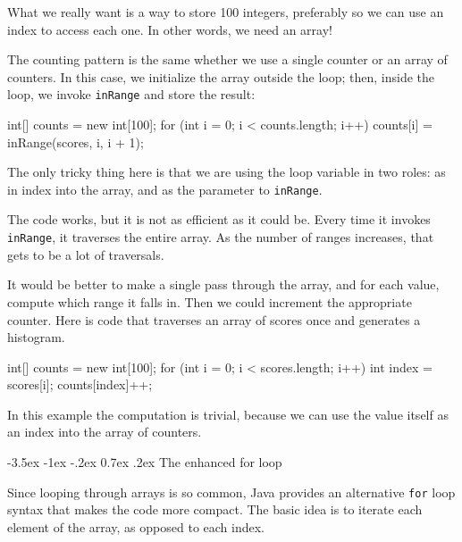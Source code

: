 \documentclass[12pt]{book}
\makeatletter
\theoremstyle{exercise}
\newcommand{\java}[1]{\verb"#1"}
\renewcommand{\section}{\@startsection {section}{1}{\z@}%
    {-3.5ex \@plus -1ex \@minus -.2ex}%
    {0.7ex \@plus.2ex}%
    {\normalfont\Large\bfseries}}
\newcommand{\java}[1]{\lstinline{#1}} %
\makeatother
\begin{document}
What we really want is a way to store 100 integers, preferably so we can use an index to access each one.
In other words, we need an array!

The counting pattern is the same whether we use a single counter or an array of counters.
In this case, we initialize the array outside the loop; then, inside the loop, we invoke \java{inRange} and store the result:

\begin{code}
    int[] counts = new int[100];
    for (int i = 0; i < counts.length; i++) {
        counts[i] = inRange(scores, i, i + 1);
    }
\end{code}

The only tricky thing here is that we are using the loop variable in two roles: as in index into the array, and as the parameter to \java{inRange}.

\label{singlepass}

The code works, but it is not as efficient as it could be.
Every time it invokes \java{inRange}, it traverses the entire array.
As the number of ranges increases, that gets to be a lot of traversals.

It would be better to make a single pass through the array, and for each value, compute which range it falls in.
Then we could increment the appropriate counter.
Here is code that traverses an array of scores once and generates a histogram.

\begin{code}
    int[] counts = new int[100];
    for (int i = 0; i < scores.length; i++) {
        int index = scores[i];
        counts[index]++;
    }
\end{code}

In this example the computation is trivial, because we can use the value itself as an index into the array of counters.


\section{The enhanced for loop}

Since looping through arrays is so common, Java provides an alternative \java{for} loop syntax that makes the code more compact.
The basic idea is to iterate each element of the array, as opposed to each index.
\end{document}
